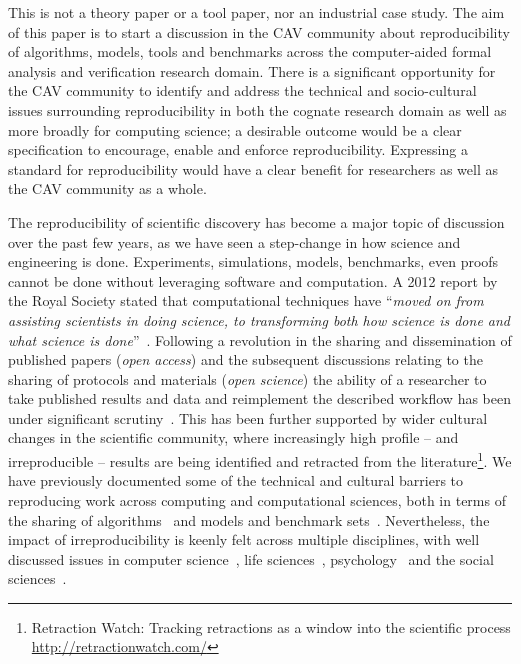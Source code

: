 \documentclass{llncs}
\begin{document}
This is not a theory paper or a tool paper, nor an industrial case
study. The aim of this paper is to start a discussion in the CAV
community about reproducibility of algorithms, models, tools and
benchmarks across the computer-aided formal analysis and verification
research domain. There is a significant opportunity for the CAV
community to identify and address the technical and socio-cultural
issues surrounding reproducibility in both the cognate research domain
as well as more broadly for computing science; a desirable outcome
would be a clear specification to encourage, enable and enforce
reproducibility. Expressing a standard for reproducibility would have
a clear benefit for researchers as well as the CAV community as a
whole.

The reproducibility of scientific discovery has become a major topic
of discussion over the past few years, as we have seen a step-change
in how science and engineering is done. Experiments, simulations,
models, benchmarks, even proofs cannot be done without leveraging
software and computation. A 2012 report by the Royal Society stated
that computational techniques have ``{\emph{moved on from assisting
scientists in doing science, to transforming both how science is done
and what science is done}}''~\cite{rssaaoe:2012}. Following a
revolution in the sharing and dissemination of published papers
(\emph{open access}) and the subsequent discussions relating to the
sharing of protocols and materials (\emph{open science}) the ability
of a researcher to take published results and data and reimplement the
described workflow has been under significant
scrutiny~\cite{stodden-et-al:2013,sandve-et-al:2013,wilson-et-al:2014}. This
has been further supported by wider cultural changes in the scientific
community, where increasingly high profile -- and irreproducible --
results are being identified and retracted from the
literature\footnote{Retraction Watch: Tracking retractions as a window
into the scientific process\\\url{http://retractionwatch.com/}}.  We
have previously documented some of the technical and cultural barriers
to reproducing work across computing and computational sciences, both
in terms of the sharing of algorithms~\cite{crick-et-al_recomp2014}
and models and benchmark
sets~\cite{crick-et-al_wssspe2}. Nevertheless, the impact of
irreproducibility is keenly felt across multiple disciplines, with
well discussed issues in computer science~\cite{collberg-et-al:2014},
life sciences~\cite{rollins-et-al:2014},
psychology~\cite{chambers-et-al:2014} and the social
sciences~\cite{conte-et-al:2012}.
\end{document}
